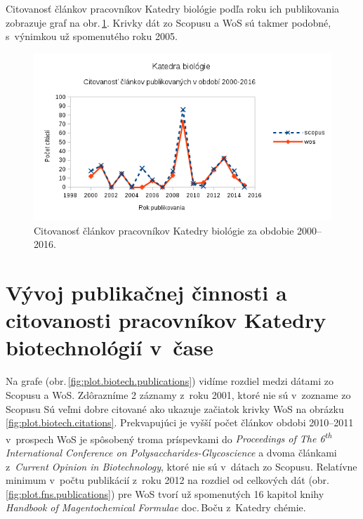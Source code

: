 Citovanosť článkov pracovníkov Katedry biológie podľa roku ich publikovania
zobrazuje graf na obr.\,\ref{fig:plot.bio.citations}.  Krivky dát zo Scopusu a
WoS sú takmer podobné, s~výnimkou už spomenutého  roku 2005.

\begin{figure}
  \centering
  \includegraphics[width=\textwidth]{obr/plot-bio-citations.png}
  \caption{Citovanosť článkov pracovníkov Katedry biológie za obdobie 2000--2016.}
  \label{fig:plot.bio.citations}
\end{figure}


\section{Vývoj publikačnej činnosti a citovanosti pracovníkov Katedry biotechnológií v~čase}

Na grafe (obr.\,\ref{fig:plot.biotech.publications}) vidíme rozdiel medzi dátami
zo Scopusu a WoS.  Zdôrazníme 2 záznamy z~roku 2001, ktoré nie sú v~zozname zo
Scopusu Sú veľmi dobre citované ako ukazuje začiatok krivky WoS na obrázku
\ref{fig:plot.biotech.citations}.  Prekvapujúci je vyšší počet článkov obdobi
2010--2011 v~prospech WoS je spôsobený troma príspevkami do \emph{Proceedings of
  The 6\textsuperscript{th} International Conference on
  Polysaccharides-Glycoscience} a dvoma článkami z~\emph{Current Opinion in
  Biotechnology}, ktoré nie sú v~dátach zo Scopusu.  Relatívne minimum v~počtu
publikácií z~roku 2012 na rozdiel od celkových dát
(obr.\,\ref{fig:plot.fns.publications}) pre WoS tvorí už spomenutých 16 kapitol
knihy \emph{Handbook of Magentochemical Formulae} doc.\,Boču z~Katedry chémie.

